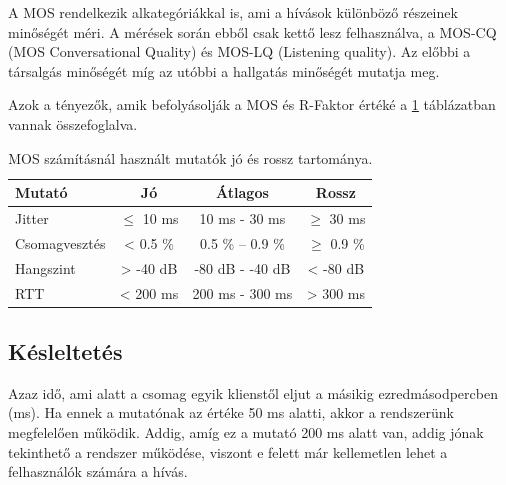 
%

A MOS rendelkezik alkategóriákkal is, ami a hívások különböző részeinek minőségét méri. A 
mérések során ebből csak kettő lesz felhasználva, a MOS-CQ (MOS Conversational Quality) 
és MOS-LQ (Listening quality). Az előbbi a társalgás minőségét míg az utóbbi a hallgatás 
minőségét mutatja meg.

Azok a tényezők, amik befolyásolják a MOS és R-Faktor értéké a \ref{tab:values} 
táblázatban vannak összefoglalva. 

\begin{table}[H]
	\footnotesize
	\centering
	\begin{tabular}{ l c c c}
		\toprule
		Mutató & Jó & Átlagos & Rossz\\
		\midrule
		Jitter & $\leq$ 10 ms & 10 ms - 30 ms & $\geq$ 30 ms\\
		Csomagvesztés & < 0.5 \%  & 0.5 \% – 0.9 \% & $\geq$ 0.9 \%\\
		Hangszint & > -40 dB & -80 dB - -40 dB & < -80 dB\\
		RTT & < 200 ms & 200 ms - 300 ms & > 300 ms\\
		\bottomrule
	\end{tabular}
	\caption{MOS számításnál használt mutatók jó és rossz tartománya.}
	\label{tab:values}
\end{table}


\subsection{Késleltetés}

Azaz idő, ami alatt a csomag egyik klienstől eljut a másikig ezredmásodpercben (ms). 
Ha ennek a mutatónak az értéke 50 ms alatti, akkor a rendszerünk megfelelően működik. 
Addig, amíg ez a mutató 200 ms alatt van, addig jónak tekinthető a rendszer 
működése, viszont e felett már kellemetlen lehet a felhasználók számára a hívás. 

